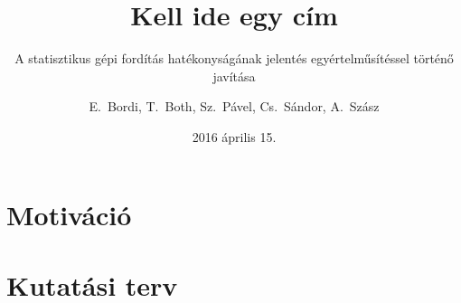 \documentclass{beamer}
\title{Kell ide egy cím}
\subtitle{A statisztikus gépi fordítás hatékonyságának jelentés egyértelműsítéssel történő javítása}
\author{E.~Bordi, T.~Both, Sz.~Pável, Cs.~Sándor, A.~Szász}
\institute[Babe\c{s}-Bolyai Tudományegyetem] %
{Babe\c{s}-Bolyai Tudományegyetem, Matematika és Informatika Kar, Kolozsvár}
\date{2016 április 15.}
\begin{document}


\section{Motiváció}

\section{Kutatási terv}






%
%
%
%
\end{document}
